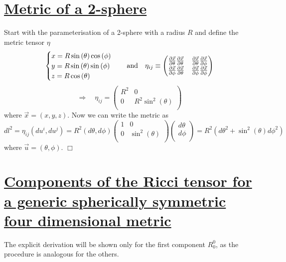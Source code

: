 
\section*{\hyperlink{Sphere}{Metric of a 2-sphere}} \label{appendix}
Start with the parameterisation of a 2-sphere with a radius $R$ and define the metric tensor $\eta$
\begin{equation*}
\centering
    \begin{cases}
      x = R \sin{(\theta)} \cos{(\phi)} \\
      y=  R \sin{(\theta)} \sin{(\phi)}\\
      z=  R \cos{(\theta)}
    \end{cases}
    \quad \text{and} \quad \eta_{ij} \equiv \begin{pmatrix}
\frac{\partial \Vec{x}}{\partial \theta} \frac{\partial \Vec{x}}{\partial \theta} & \frac{\partial \Vec{x}}{\partial \theta} \frac{\partial \Vec{x}}{\partial \phi} \\
\frac{\partial \Vec{x}}{\partial \phi}\frac{\partial \Vec{x}}{\partial \theta} & \frac{\partial \Vec{x}}{\partial \phi}\frac{\partial \Vec{x}}{\partial \phi} \\
\end{pmatrix}
\end{equation*}
\begin{equation*}
    \Rightarrow  \quad \eta_{ij}=\begin{pmatrix}
R^2 & 0 \\
0 & R^2 \sin^2(\theta) \\
\end{pmatrix}
\end{equation*}
where $\Vec{x}=\left( x , y , z \right)$. Now we can write the metric as
\begin{equation*}
    dl^2= \eta_{ij}\left( du^i , du^j \right) = R^2 \left( d\theta , d\phi \right) \begin{pmatrix}
1 & 0 \\
0 & \sin^2(\theta) \\
\end{pmatrix} \begin{pmatrix}
d\theta \\
d\phi \\
\end{pmatrix} = R^2 \left( d\theta^2 + \sin^2(\theta)d\phi^2 \right)
\end{equation*} 
where $\Vec{u}=(\theta,\phi)$.
\hspace*{\fill} $\Box$

\section*{\hyperlink{Ricci}{Components of the Ricci tensor for a generic spherically symmetric four dimensional metric}}
The explicit derivation will be shown only for the first component $R^0_0$, as the procedure is analogous for the others.

